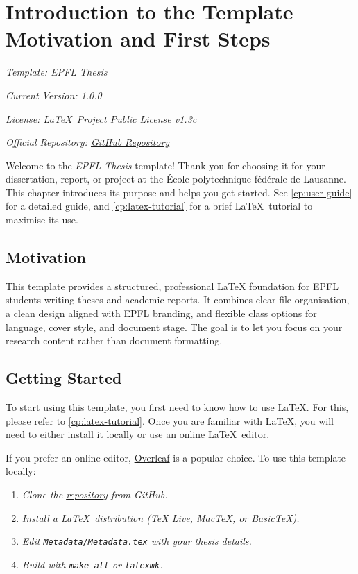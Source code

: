\chapter[Introduction to the Template: Motivation and First Steps]{Introduction to the Template Motivation and First Steps}
\label{cp:introduction}

{
\parindent0pt

\textit{Template: EPFL Thesis}

\textit{Current Version: 1.0.0}

\textit{License: \LaTeX~Project Public License v1.3c}

\textit{Official Repository: \href{https://github.com/pmdlt/epfl-thesis}{GitHub Repository}}

\vspace{.935em}

Welcome to the \textcolor{maincolor}{\textit{EPFL Thesis}} template! Thank you for choosing it for your dissertation, report, or project at the École polytechnique fédérale de Lausanne. This chapter introduces its purpose and helps you get started. See \autoref{cp:user-guide} for a detailed guide, and \autoref{cp:latex-tutorial} for a brief \LaTeX~tutorial to maximise its use.
}

\section{Motivation}
This template provides a structured, professional LaTeX foundation for EPFL students writing theses and academic reports. It combines clear file organisation, a clean design aligned with EPFL branding, and flexible class options for language, cover style, and document stage. The goal is to let you focus on your research content rather than document formatting.

\section{Getting Started}
To start using this template, you first need to know how to use \LaTeX. For this, please refer to \autoref{cp:latex-tutorial}. Once you are familiar with \LaTeX, you will need to either install it locally or use an online \LaTeX~editor.

If you prefer an online editor, \href{https://www.overleaf.com/}{Overleaf} is a popular choice. To use this template locally:

\begin{enumerate}[font=\itshape]
    \setlength{\itemsep}{.375em}
    \item \textit{Clone the \href{https://github.com/pmdlt/epfl-thesis}{repository} from GitHub.}
    \item \textit{Install a \LaTeX~distribution (TeX Live, MacTeX, or BasicTeX).}
    \item \textit{Edit \texttt{Metadata/Metadata.tex} with your thesis details.}
    \item \textit{Build with \texttt{make all} or \texttt{latexmk}.}
\end{enumerate}

